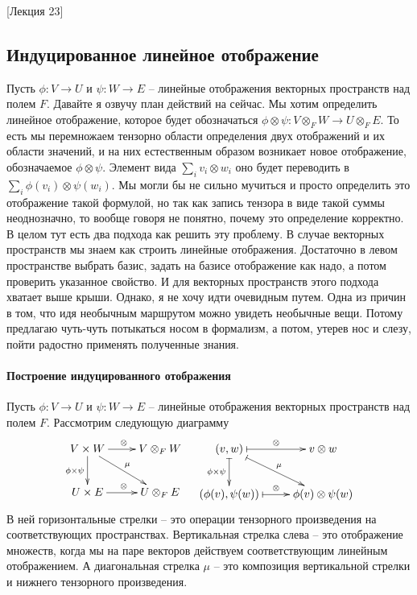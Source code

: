 [Лекция 23]


\subsection{Индуцированное линейное отображение}

Пусть $\phi\colon V\to U$ и $\psi\colon W\to E$ -- линейные отображения векторных пространств над полем $F$.
Давайте я озвучу план  действий на сейчас.
Мы хотим определить линейное отображение, которое будет обозначаться $\phi\otimes \psi\colon V\otimes_F W\to U\otimes_F E$.
То есть мы перемножаем тензорно области определения двух отображений и их области значений, и на них естественным образом возникает новое отображение, обозначаемое $\phi\otimes\psi$.
Элемент вида $\sum_i v_i\otimes w_i$ оно будет переводить в $\sum_i \phi(v_i) \otimes \psi(w_i)$.
Мы могли бы не сильно мучиться и просто определить это отображение такой формулой, но так как запись тензора в виде такой суммы неоднозначно, то вообще говоря не понятно, почему это определение корректно.
В целом тут есть два подхода как решить эту проблему.
В случае векторных пространств мы знаем как строить линейные отображения.
Достаточно в левом пространстве выбрать базис, задать на базисе отображение как надо, а потом проверить указанное свойство.
И для векторных пространств этого подхода хватает выше крыши.
Однако, я не хочу идти очевидным путем.
Одна из причин в том, что идя необычным маршрутом можно увидеть необычные вещи.
Потому предлагаю чуть-чуть потыкаться носом в формализм, а потом, утерев нос и слезу, пойти радостно применять полученные знания.

\paragraph{Построение индуцированного отображения}

Пусть $\phi\colon V\to U$ и $\psi\colon W\to E$ -- линейные отображения векторных пространств над полем $F$.
Рассмотрим следующую диаграмму
\[
\xymatrix{
	{V\times W}\ar[d]_{\phi\times \psi}\ar[r]^{\otimes}\ar[rd]^{\mu}&{V\otimes_F W}\\
	{U\times E}\ar[r]^{\otimes}&{U\otimes_F E}
}
\quad
\xymatrix{
	{(v, w)}\ar@{|->}[d]_{\phi\times\psi}\ar@{|->}[r]^{\otimes}\ar@{|->}[rd]^{\mu}&{v\otimes w}\\
	{(\phi(v), \psi(w))}\ar@{|->}[r]^{\otimes}&{\phi(v)\otimes\psi(w)}
}
\]
В ней горизонтальные стрелки -- это операции тензорного произведения  на соответствующих пространствах.
Вертикальная стрелка слева -- это отображение множеств, когда мы на паре векторов действуем соответствующим линейным отображением.
А диагональная стрелка $\mu$ -- это композиция вертикальной стрелки и нижнего тензорного произведения.

